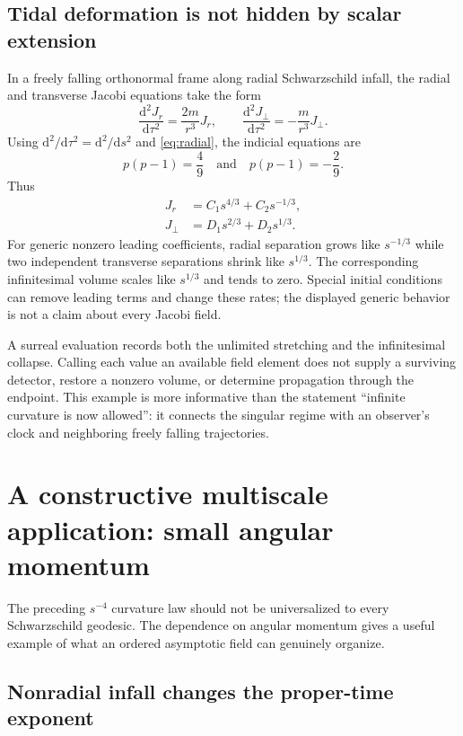 \documentclass[11pt,letterpaper]{article}
\newcommand{\dd}{\mathrm{d}}
\theoremstyle{definition}
\theoremstyle{remark}
\begin{document}
\subsection{Tidal deformation is not hidden by scalar extension}

In a freely falling orthonormal frame along radial Schwarzschild infall, the
radial and transverse Jacobi equations take the form
\begin{equation}
 \frac{\dd^2J_r}{\dd\tau^2}=\frac{2m}{r^3}J_r,
 \qquad
 \frac{\dd^2J_\perp}{\dd\tau^2}=-\frac{m}{r^3}J_\perp.
 \label{eq:jacobi}
\end{equation}
Using $\dd^2/\dd\tau^2=\dd^2/\dd s^2$ and \eqref{eq:radial}, the indicial
equations are
\[
 p(p-1)=\frac49 \quad\text{and}\quad p(p-1)=-\frac29.
\]
Thus
\begin{align}
 J_r&=C_1s^{4/3}+C_2s^{-1/3},\label{eq:Jr}\\
 J_\perp&=D_1s^{2/3}+D_2s^{1/3}.\label{eq:Jt}
\end{align}
For generic nonzero leading coefficients, radial separation grows like
$s^{-1/3}$ while two independent transverse separations shrink like $s^{1/3}$.
The corresponding infinitesimal volume scales like $s^{1/3}$ and tends to zero.
Special initial conditions can remove leading terms and change these rates;
the displayed generic behavior is not a claim about every Jacobi field.

A surreal evaluation records both the unlimited stretching and the
infinitesimal collapse. Calling each value an available field element does not
supply a surviving detector, restore a nonzero volume, or determine propagation
through the endpoint. This example is more informative than the statement
``infinite curvature is now allowed'': it connects the singular regime with
an observer's clock and neighboring freely falling trajectories.

\section{A constructive multiscale application: small angular momentum}
\label{sec:angular}

The preceding $s^{-4}$ curvature law should not be universalized to every
Schwarzschild geodesic. The dependence on angular momentum gives a useful
example of what an ordered asymptotic field can genuinely organize.

\subsection{Nonradial infall changes the proper-time exponent}
\end{document}
